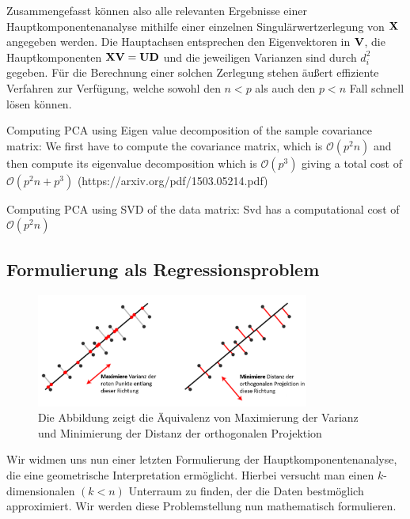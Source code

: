 Zusammengefasst können also alle relevanten Ergebnisse einer Hauptkomponentenanalyse mithilfe einer einzelnen Singulärwertzerlegung von $\mathbf{X}$ angegeben werden. Die Hauptachsen entsprechen den Eigenvektoren in $\mathbf{V}$, die Hauptkomponenten $\mathbf{X} \mathbf{V} = \mathbf{U} \mathbf{D}$ und die jeweiligen Varianzen sind durch $d_i^2$ gegeben. Für die Berechnung einer solchen Zerlegung stehen äußert effiziente Verfahren zur Verfügung, welche sowohl den $n<p$ als auch den $p<n$ Fall schnell lösen können.  

Computing PCA using Eigen value decomposition of the sample covariance matrix:
We first have to compute the covariance matrix, which is $\mathcal{O}(p^2n)$ and then compute its eigenvalue decomposition which is $\mathcal{O}(p^3)$ giving a total cost of $\mathcal{O}(p^2n+p^3)$ (https://arxiv.org/pdf/1503.05214.pdf)

Computing PCA using SVD of the data matrix:
Svd has a computational cost of $\mathcal{O}(p^2n)$

\subsection{Formulierung als Regressionsproblem}

\begin{figure}
\centering
\includegraphics[width = 0.8\textwidth]{figures/pca_projection_explanation_german.png}
\caption{Die Abbildung zeigt die Äquivalenz von Maximierung der Varianz und Minimierung der Distanz der orthogonalen Projektion}
\label{pca_projection_explanation}
\end{figure}

Wir widmen uns nun einer letzten Formulierung der Hauptkomponentenanalyse, die eine geometrische Interpretation ermöglicht. Hierbei versucht man einen $k$-dimensionalen $(k < n)$ Unterraum zu finden, der die Daten bestmöglich approximiert. Wir werden diese Problemstellung nun mathematisch formulieren.


